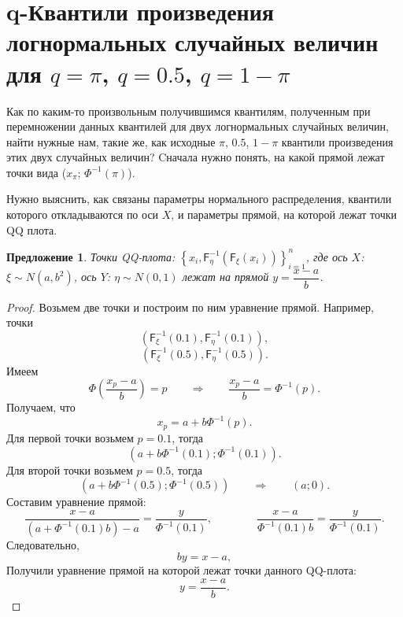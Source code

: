 \documentclass[specialist, substylefile = spbu.rtx,
subf,href,colorlinks=true, 12pt]{disser}
\newtheorem{proposition}[theorem]{Предложение}
\begin{document}
	\section{q-Квантили произведения логнормальных случайных величин для $q=\pi$, $q=0.5$, $q=1-\pi$}	
	Как по каким-то произвольным получившимся квантилям, полученным при перемножении данных квантилей для двух логнормальных случайных величин, найти нужные нам, такие же, как исходные $\pi$, $0.5$, $1-\pi$ квантили произведения этих двух случайных величин? Cначала нужно понять, на какой прямой лежат точки вида ($x_{\pi}$; $\Phi^{-1}(\pi)$).
	
	Нужно выяснить, как связаны параметры нормального распределения, квантили которого откладываются по оси $X$, и параметры прямой, на которой лежат точки QQ плота.
	
	\begin{proposition}\label{pr10}
		Точки QQ-плота: $\left\{x_{i},\mathsf{F}_{\eta}^{-1}(\mathsf{F}_{\xi}(x_{i}))\right\}_{i=1}^{n}$, где
		ось $X$: $\xi \sim N(a, b^{2})$, ось $Y$: $\eta \sim N(0, 1)$
		лежат на прямой $y = \dfrac{x-a}{b}$.
	\end{proposition}
	\begin{proof}
		Возьмем две точки и построим по ним уравнение прямой. Например, точки
		\[(\mathsf{F}_{\xi}^{-1}(0.1), \mathsf{F}_{\eta}^{-1}(0.1)),\]
		\[(\mathsf{F}_{\xi}^{-1}(0.5), \mathsf{F}_{\eta}^{-1}(0.5)).\]
		Имеем
		\begin{equation*}
			\Phi\left(\dfrac{x_{p}-a}{b}\right)=p\quad\quad \Rightarrow \quad\quad \dfrac{x_{p}-a}{b}=\Phi^{-1}(p).
		\end{equation*}
		Получаем, что
		\begin{equation*}
			x_{p}=a+b\Phi^{-1}(p).
		\end{equation*}
		Для первой точки возьмем $p = 0.1$, тогда
		\[(a+b\Phi^{-1}(0.1); \Phi^{-1}(0.1)).\]
		Для второй точки возьмем $p = 0.5$, тогда
		\[(a+b\Phi^{-1}(0.5); \Phi^{-1}(0.5)) \quad\quad \Rightarrow \quad\quad (a;0). \]
		Составим уравнение прямой:
		\[\dfrac{x-a}{(a+\Phi^{-1}(0.1)b)-a} = \dfrac{y}{\Phi^{-1}(0.1)}, \quad\quad\quad\quad \dfrac{x-a}{\Phi^{-1}(0.1)b} = \dfrac{y}{\Phi^{-1}(0.1)}.\]
		Следовательно,
		\begin{equation*} 
			by = x-a,
		\end{equation*}
		Получили уравнение прямой на которой лежат точки данного QQ-плота:
		\begin{equation*}
			y = \dfrac{x-a}{b}.
		\end{equation*}
	\end{proof}
	
\end{document}

